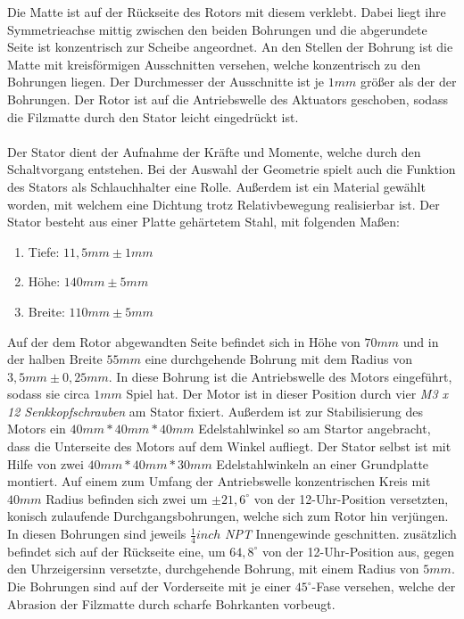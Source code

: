 Die Matte ist auf der R\"{u}ckseite des Rotors mit diesem verklebt. Dabei liegt ihre Symmetrieachse mittig zwischen den beiden Bohrungen und die abgerundete Seite ist konzentrisch zur Scheibe angeordnet. An den Stellen der Bohrung ist die Matte mit kreisf\"{o}rmigen Ausschnitten versehen, welche konzentrisch zu den Bohrungen liegen. Der Durchmesser der Ausschnitte ist je \(1 mm\) gr\"{o}{\ss}er als der der Bohrungen. Der Rotor ist auf die Antriebswelle des Aktuators geschoben, sodass die Filzmatte durch den Stator leicht eingedr\"{u}ckt ist.
\\\\
Der Stator dient der Aufnahme der Kr\"{a}fte und Momente, welche durch den Schaltvorgang entstehen. Bei der Auswahl der Geometrie spielt auch die Funktion des Stators als Schlauchhalter eine Rolle. Au{\ss}erdem ist ein Material gew\"{a}hlt worden, mit welchem eine Dichtung trotz Relativbewegung realisierbar ist. Der Stator besteht aus einer Platte geh\"{a}rtetem Stahl, mit folgenden Ma{\ss}en:
\begin{enumerate}
	\item Tiefe: \(11,5 mm \pm 1 mm\)
	\item H\"{o}he: \(140 mm \pm 5mm\)
	\item Breite: \(110 mm \pm 5 mm\)
\end{enumerate}
Auf der dem Rotor abgewandten Seite befindet sich in H\"{o}he von \(70 mm\) und in der halben Breite \(55 mm\) eine durchgehende Bohrung mit dem Radius von \(3,5 mm \pm 0,25 mm\). In diese Bohrung ist die Antriebswelle des Motors eingef\"{u}hrt, sodass sie circa \(1 mm\) Spiel hat. Der Motor ist in dieser Position durch vier \textit{M3 x 12 Senkkopfschrauben} am Stator fixiert. Au{\ss}erdem ist zur Stabilisierung des Motors ein \( 40mm * 40 mm * 40 mm\) Edelstahlwinkel so am Startor angebracht, dass die Unterseite des Motors auf dem Winkel aufliegt. Der Stator selbst ist mit Hilfe von zwei \(40mm * 40mm * 30mm\) Edelstahlwinkeln an einer Grundplatte montiert. Auf einem zum Umfang der Antriebswelle konzentrischen Kreis mit \(40mm\) Radius befinden sich zwei um \(\pm 21,6^\circ\) von der 12-Uhr-Position versetzten, konisch zulaufende Durchgangsbohrungen, welche sich zum Rotor hin verj\"{u}ngen. In diesen Bohrungen sind jeweils \(\frac{1}{4} inch\) \textit{NPT} Innengewinde geschnitten. zus\"{a}tzlich befindet sich auf der R\"{u}ckseite eine, um \(64,8^\circ\) von der 12-Uhr-Position aus, gegen den Uhrzeigersinn versetzte, durchgehende Bohrung, mit einem Radius von \(5mm\). Die Bohrungen sind auf der Vorderseite mit je einer \(45^\circ\)-Fase versehen, welche der Abrasion der Filzmatte durch scharfe Bohrkanten vorbeugt.

